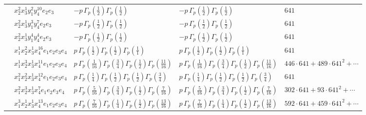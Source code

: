 \documentclass[11pt]{article}
\begin{document}
\begin{table}[ht]
{\begin{tabular}{@{}lllll@{}}
 & $x_{2}^{2} x_{3}^{1} y_{1}^{2} y_{4}^{10} e_{2} e_{3}$ & $- p \, \Gamma_p \left( \frac{1}{2} \right) \Gamma_p \left( \frac{1}{2} \right)$ & $- p \, \Gamma_p \left( \frac{1}{2} \right) \Gamma_p \left( \frac{1}{2} \right)$ & $641$ \\
 & $x_{2}^{2} x_{3}^{1} y_{1}^{3} y_{4}^{7} e_{2} e_{3}$ & $- p \, \Gamma_p \left( \frac{1}{2} \right) \Gamma_p \left( \frac{1}{2} \right)$ & $- p \, \Gamma_p \left( \frac{1}{2} \right) \Gamma_p \left( \frac{1}{2} \right)$ & $641$ \\
 & $x_{2}^{2} x_{3}^{1} y_{1}^{4} y_{4}^{4} e_{2} e_{3}$ & $- p \, \Gamma_p \left( \frac{1}{2} \right) \Gamma_p \left( \frac{1}{2} \right)$ & $- p \, \Gamma_p \left( \frac{1}{2} \right) \Gamma_p \left( \frac{1}{2} \right)$ & $641$ \\
 & $x_{1}^{1} x_{2}^{2} x_{3}^{1} x_{4}^{16}  e_{1} e_{2} e_{3} e_{4}$ & $p \, \Gamma_p \left( \frac{1}{2} \right) \Gamma_p \left( \frac{1}{2} \right) \Gamma_p \left( \frac{1}{1} \right)$ & $p \, \Gamma_p \left( \frac{1}{2} \right) \Gamma_p \left( \frac{1}{2} \right) \Gamma_p \left( \frac{1}{1} \right)$ & $641$ \\
 & $x_{1}^{1} x_{2}^{3} x_{3}^{1} x_{4}^{11}  e_{1} e_{2} e_{3} e_{4}$ & $p \, \Gamma_p \left( \frac{1}{16} \right) \Gamma_p \left( \frac{3}{4} \right) \Gamma_p \left( \frac{1}{2} \right) \Gamma_p \left( \frac{11}{16} \right)$ & $p \, \Gamma_p \left( \frac{1}{16} \right) \Gamma_p \left( \frac{3}{4} \right) \Gamma_p \left( \frac{1}{2} \right) \Gamma_p \left( \frac{11}{16} \right)$ & $446{\cdot}641{+}489{\cdot}641^{2}{+}\cdots$ \\
 & $x_{1}^{2} x_{2}^{2} x_{3}^{1} x_{4}^{12}  e_{1} e_{2} e_{3} e_{4}$ & $p \, \Gamma_p \left( \frac{1}{4} \right) \Gamma_p \left( \frac{1}{2} \right) \Gamma_p \left( \frac{1}{2} \right) \Gamma_p \left( \frac{3}{4} \right)$ & $p \, \Gamma_p \left( \frac{1}{4} \right) \Gamma_p \left( \frac{1}{2} \right) \Gamma_p \left( \frac{1}{2} \right) \Gamma_p \left( \frac{3}{4} \right)$ & $641$ \\
 & $x_{1}^{2} x_{2}^{3} x_{3}^{1} x_{4}^{7}  e_{1} e_{2} e_{3} e_{4}$ & $p \, \Gamma_p \left( \frac{5}{16} \right) \Gamma_p \left( \frac{3}{4} \right) \Gamma_p \left( \frac{1}{2} \right) \Gamma_p \left( \frac{7}{16} \right)$ & $p \, \Gamma_p \left( \frac{5}{16} \right) \Gamma_p \left( \frac{3}{4} \right) \Gamma_p \left( \frac{1}{2} \right) \Gamma_p \left( \frac{7}{16} \right)$ & $302{\cdot}641{+}93{\cdot}641^{2}{+}\cdots$ \\
 & $x_{1}^{3} x_{2}^{1} x_{3}^{1} x_{4}^{13}  e_{1} e_{2} e_{3} e_{4}$ & $p \, \Gamma_p \left( \frac{7}{16} \right) \Gamma_p \left( \frac{1}{4} \right) \Gamma_p \left( \frac{1}{2} \right) \Gamma_p \left( \frac{13}{16} \right)$ & $p \, \Gamma_p \left( \frac{7}{16} \right) \Gamma_p \left( \frac{1}{4} \right) \Gamma_p \left( \frac{1}{2} \right) \Gamma_p \left( \frac{13}{16} \right)$ & $592{\cdot}641{+}459{\cdot}641^{2}{+}\cdots$ \\

\end{tabular}}
\end{table}
\end{document}

